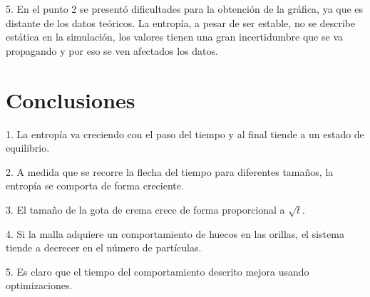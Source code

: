 \documentclass{article}
\begin{document}
\begin{multicols}{2}
5. En el punto 2 se presentó dificultades para la obtención de la gráfica, ya que es distante de los datos teóricos. La entropía, a pesar de ser estable, no se describe estática en la simulación, los valores tienen una gran incertidumbre que se va propagando y por eso se ven afectados los datos.

\section*{Conclusiones}

1. La entropía va creciendo con el paso del tiempo y al final tiende a un estado de equilibrio.

2. A medida que se recorre la flecha del tiempo para diferentes tamaños, la entropía se comporta de forma creciente.

3. El tamaño de la gota de crema crece de forma proporcional a $\sqrt{t}$.

4. Si la malla adquiere un comportamiento de huecos en las orillas, el sistema tiende a decrecer en el número de partículas.

5. Es claro que el tiempo del comportamiento descrito mejora usando optimizaciones.

\end{multicols}
\end{document}
